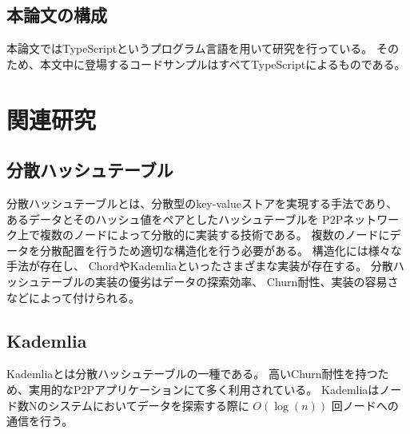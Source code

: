 \documentclass[sotsuron]{jcsie}
\begin{document}
\section{本論文の構成}
本論文ではTypeScriptというプログラム言語を用いて研究を行っている。
そのため、本文中に登場するコードサンプルはすべてTypeScriptによるものである。


\chapter{関連研究}
\section{分散ハッシュテーブル}
分散ハッシュテーブルとは、分散型のkey-valueストアを実現する手法であり、
あるデータとそのハッシュ値をペアとしたハッシュテーブルを
P2Pネットワーク上で複数のノードによって分散的に実装する技術である。
複数のノードにデータを分散配置を行うため適切な構造化を行う必要がある。
構造化には様々な手法が存在し、
ChordやKademliaといったさまざまな実装が存在する。
分散ハッシュテーブルの実装の優劣はデータの探索効率、
Churn耐性、実装の容易さなどによって付けられる。

\section{Kademlia}
Kademliaとは分散ハッシュテーブルの一種である。
高いChurn耐性を持つため、実用的なP2Pアプリケーションにて多く利用されている。
Kademliaはノード数Nのシステムにおいてデータを探索する際に
$O(\log(n))$ 回ノードへの通信を行う。
\end{document}
